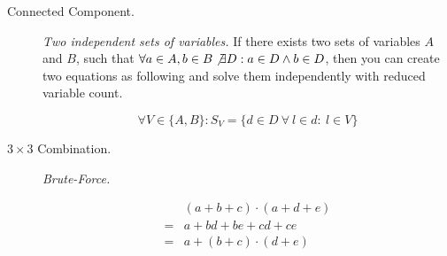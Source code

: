 \documentclass[12pt, letterpaper]{article}
\begin{document}
    \begin{description}
        \item[Connected Component.] {
            \emph{Two independent sets of variables.}
            If there exists two sets of variables $A$ and $B$, such that
            $\forall a \in A, b \in B \not\exists D: a \in D \land b \in D$,
            then you can create two equations as following and solve them
            independently with reduced variable count.

            \[\forall V \in \{A, B\}: S_V =\{d\in D\ \forall\ l \in d:\ l \in V\}\]
        }
        \item[$3 \times 3$ Combination.] {
            \emph{Brute-Force.}

            \begin{equation}
                \nonumber
                \begin{aligned}
                    & (a + b + c)\cdot(a + d + e)\\
                    = & a + bd + be + cd + ce \\
                    = & a + (b + c)\cdot(d + e)
                \end{aligned}
              \end{equation}
        }
    \end{description}
\end{document}
